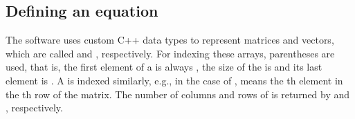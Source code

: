 \documentclass[10pt,a4paper]{ddedoc}
\begin{document}
% 

\subsection{Defining an equation}

The software uses custom C++ data types to represent matrices and vectors,
which are called  and , respectively. For indexing
these arrays, parentheses are used, that is, the first element of a
  is always , the size of the  is
 and its last
element is . A  is indexed similarly, e.g., in
the case of ,  means the th element in the
th row of the matrix. The number of columns and rows of  is returned by  and , respectively.
\end{document}
